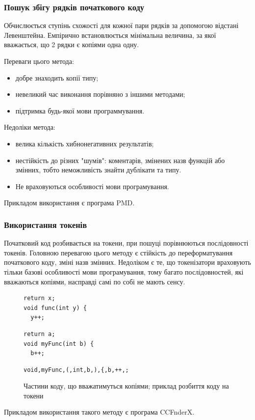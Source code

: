 \documentclass[a4paper, 14pt]{article}
\newcommand{\RNum}[1]{\uppercase\expandafter{\romannumeral #1\relax}}
\begin{document}
\subsubsection{Пошук збігу рядків початкового коду}
Обчислюється ступінь схожості для кожної пари рядків за допомогою відстані Левенштейна. Емпірично встановлюється мінімальна величина, за якої вважається, що 2 рядки є копіями одна одну. 

Переваги цього метода:  
\begin{itemize}
\item добре знаходить копії \RNum{1} типу;
\item невеликий час виконання порівняно з іншими методами;
\item підтримка будь-якої мови программування.
\end{itemize}

Недоліки метода:
\begin{itemize}
\item велика кількість хибнонегативних результатів;
\item нестійкість до різних "шумів": коментарів, змінених назв функцій або змінних, тобто неможливість знайти дублікати \RNum{2} та \RNum{3} типу. 
\item Не враховуються особливості мови програмування.
\end{itemize}
Прикладом використання є програма PMD.
\subsubsection{Використання токенів}
Початковий код розбивається на токени, при пошуці порівнюються послідовності токенів.
Головною перевагою цього методу є стійкість до переформатування початкового коду, зміні назв змінних.
Недоліком є те, що токенізатори враховують тільки базові особливості мови програмування, тому багато послідовностей, які вважаються копіями, насправді самі по собі не мають сенсу. \cite{Koschke06}
\begin{figure}[h!]
\centering
\begin{minipage}[t]{.275\textwidth}
\begin{lstlisting}[frame=none]
return x;
void func(int y) {
  y++;
\end{lstlisting}
\end{minipage}
\begin{minipage}[t]{.275\textwidth}
\begin{lstlisting}[frame=none]
return a;
void myFunc(int b) {
  b++;
\end{lstlisting}
\end{minipage}
\begin{minipage}[t]{.35\textwidth}
\begin{lstlisting}[frame=none]
void,myFunc,(,int,b,),{,b,++,;
\end{lstlisting}
\end{minipage}
\caption*{Частини коду, що вважатимуться копіями; приклад розбиття коду на токени}
\end{figure}
Прикладом використання такого методу є програма CCFnderX. 
\end{document}
